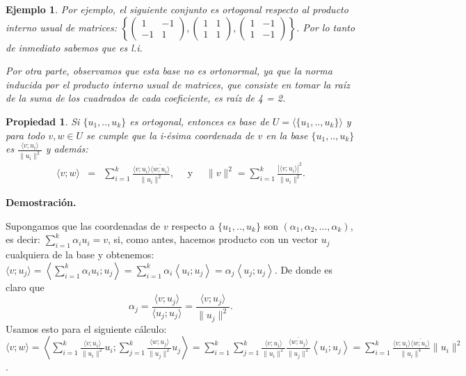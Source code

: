 \documentclass[12pt]{book}
\newtheorem{prop}{Propiedad}
\newtheorem{ejem}{Ejemplo}
\begin{document}
{\begin{ejem} {\em
Por ejemplo, el siguiente conjunto es ortogonal respecto al producto interno usual de matrices: $\left\{\left(\begin{array}{rr} 1&-1\\-1&1\end{array}\right), \left(\begin{array}{rr} 1&1\\1&1\end{array}\right),\left(\begin{array}{rr} 1&-1\\1&-1\end{array}\right)\right\}$.
Por lo tanto de inmediato sabemos que es l.i.

Por otra parte, observamos que esta base no es ortonormal, ya que la norma inducida por el producto interno usual de matrices, que consiste en tomar la raíz de la suma de los cuadrados de cada coeficiente, es raíz de 4 = 2.
}
\end{ejem}

\begin{prop}
Si $\{u_1,..,u_k\}$ es ortogonal, entonces es base de $U=\langle\{u_1,..,u_k\}\rangle$ y para todo $v,w\in U$ se cumple que la i-ésima coordenada de $v$ en la base $\{u_1,..,u_k\}$ es $\frac{\langle v;u_i\rangle}{\|u_i\|^2}$ y además:
\begin{eqnarray*}
\langle v;w\rangle &=& \sum_{i=1}^k \frac{ \langle v;u_i\rangle\overline{\langle w;u_i\rangle}}{\|u_i\|^2},\quad \textrm{ y }\quad
\|v\|^2=\sum_{i=1}^k \frac{|\langle v;u_i\rangle|^2}{\|u_i\|^2}.
\end{eqnarray*}
\end{prop}
    {\bf Demostración.} {\small
      Supongamos que las coordenadas de $v$ respecto a $\{u_1,..,u_k\}$ son $(\alpha_1,\alpha_2,\dots,\alpha_k)$, es decir:
      $\sum_{i=1}^k\alpha_i u_i=v$,
      si, como antes, hacemos producto con un vector $u_j$ cualquiera de la base y obtenemos:
      $\langle v;u_j\rangle = \left\langle\sum_{i=1}^k\alpha_iu_i;u_j\right\rangle=\sum_{i=1}^k\alpha_i\left\langle u_i;u_j\right\rangle=\alpha_j\left\langle u_j;u_j\right\rangle$.
      De donde es claro que $$\alpha_j=\frac{\langle v;u_j\rangle}{\langle u_j;u_j\rangle}=\frac{\langle v;u_j\rangle}{\|u_j\|^2}.$$
      Usamos esto para el siguiente cálculo:\\
      $\displaystyle{
        \langle v;w\rangle =\left\langle\sum_{i=1}^k \frac{\langle v;u_i\rangle}{\|u_i\|^2}u_i;\sum_{j=1}^k \frac{\langle w;u_j\rangle}{\|u_j\|^2}u_j\right\rangle
        = \sum_{i=1}^k\sum_{j=1}^k  \frac{\langle v;u_i\rangle}{\|u_i\|^2}\frac{\overline{\langle w;u_j\rangle}}{\|u_j\|^2} \left\langle u_i;u_j\right\rangle
        = \sum_{i=1}^k\frac{\langle v;u_i\rangle\overline{\langle w;u_i\rangle}}{\|u_i\|^4}\|u_i\|^2}$.
        
}}
\end{document}

